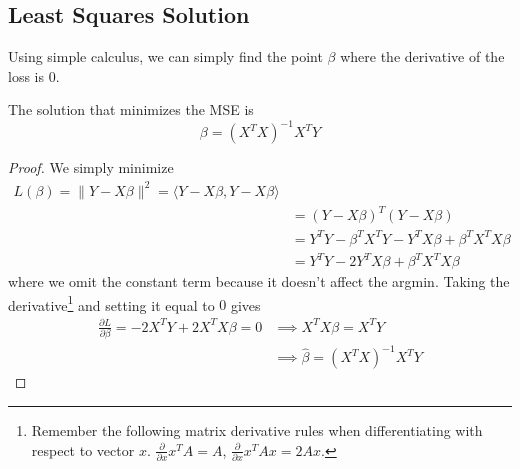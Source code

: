 \subsection{Least Squares Solution} 

  Using simple calculus, we can simply find the point $\beta$ where the derivative of the loss is $0$. 
 
  \begin{theorem}
    The solution that minimizes the MSE is 
    \begin{equation}
      \beta = (X^T X)^{-1} X^T Y 
    \end{equation}
  \end{theorem}
  \begin{proof}
    We simply minimize 
    \begin{align}
      L(\beta) = \|Y - X \beta\|^2 = \langle Y - X \beta, Y - X \beta \rangle \\ 
      & = (Y - X \beta)^T (Y - X \beta) \\ 
      & = Y^T Y - \beta^T X^T Y - Y^T X \beta + \beta^T X^T X \beta \\
      & = Y^T Y - 2 Y^T X \beta + \beta^T X^T X \beta 
    \end{align}
    where we omit the constant term because it doesn't affect the argmin. Taking the derivative\footnote{Remember the following matrix derivative rules when differentiating with respect to vector $x$. $\frac{\partial}{\partial x} x^T A = A$, $\frac{\partial}{\partial x} x^T A x = 2 Ax$. } and setting it equal to $0$ gives 
    \begin{align}
    \frac{\partial L}{\partial \beta} = - 2 X^T Y + 2 X^T X \beta = 0  
    & \implies X^T X \beta = X^T Y \\ 
    & \implies \hat{\beta} = (X^T X)^{-1} X^T Y
    \end{align}
  \end{proof} 

